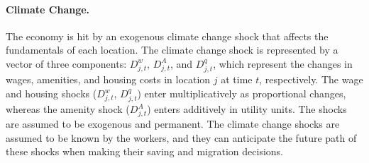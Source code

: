\documentclass[11pt, a4paper]{article}
\begin{document}
\paragraph{Climate Change.} The economy is hit by an exogenous climate change shock that affects the fundamentals of each location. The climate change shock is represented by a vector of three components: $D^w_{j,t}$, $D^A_{j,t}$, and $D^q_{j,t}$, which represent the changes in wages, amenities, and housing costs in location $j$ at time $t$, respectively. The wage and housing shocks ($D^w_{j,t}$, $D^q_{j,t}$) enter multiplicatively as proportional changes, whereas the amenity shock ($D^A_{j,t}$) enters additively in utility units. The shocks are assumed to be exogenous and permanent. The climate change shocks are assumed to be known by the workers, and they can anticipate the future path of these shocks when making their saving and migration decisions.
\end{document}
